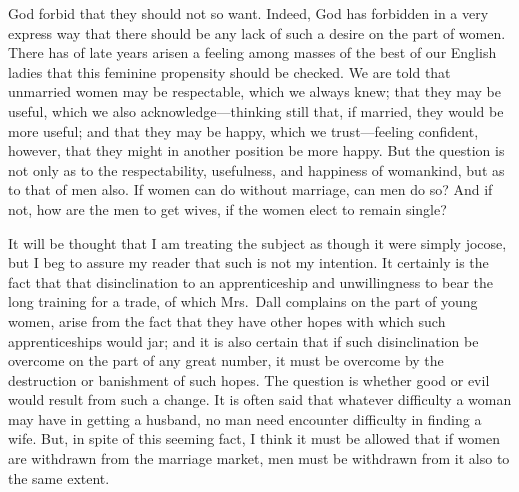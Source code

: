 God forbid that they should not so want.  Indeed, God has forbidden
in a very express way that there should be any lack of such a
desire on the part of women.  There has of late years arisen a
feeling among masses of the best of our English ladies that this
feminine propensity should be checked.  We are told that unmarried
women may be respectable, which we always knew; that they may be
useful, which we also acknowledge---thinking still that, if married,
they would be more useful; and that they may be happy, which we
trust---feeling confident, however, that they might in another
position be more happy.  But the question is not only as to the
respectability, usefulness, and happiness of womankind, but as to
that of men also.  If women can do without marriage, can men do so?
And if not, how are the men to get wives, if the women elect to
remain single?

It will be thought that I am treating the subject as though it were
simply jocose, but I beg to assure my reader that such is not my
intention.  It certainly is the fact that that disinclination to an
apprenticeship and unwillingness to bear the long training for a
trade, of which Mrs.\ Dall complains on the part of young women,
arise from the fact that they have other hopes with which such
apprenticeships would jar; and it is also certain that if such
disinclination be overcome on the part of any great number, it must
be overcome by the destruction or banishment of such hopes.  The
question is whether good or evil would result from such a change.
It is often said that whatever difficulty a woman may have in
getting a husband, no man need encounter difficulty in finding a
wife.  But, in spite of this seeming fact, I think it must be
allowed that if women are withdrawn from the marriage market, men
must be withdrawn from it also to the same extent.

